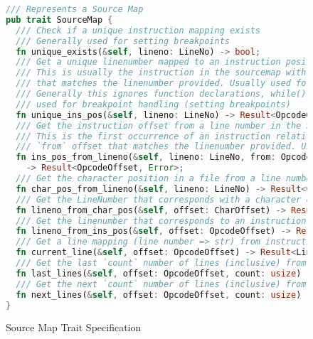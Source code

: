 \documentclass{report}
\begin{document}
\begin{figure}[!h]
    \begin{lstlisting}[language=Rust,basicstyle=\footnotesize]
/// Represents a Source Map
pub trait SourceMap {
  /// Check if a unique instruction mapping exists
  /// Generally used for setting breakpoints
  fn unique_exists(&self, lineno: LineNo) -> bool;
  /// Get a unique linenumber mapped to an instruction position
  /// This is usually the instruction in the sourcemap with the shortest length,
  /// that matches the linenumber provided. Usually used for run_until().
  /// Generally this ignores function declarations, while() loops, and if() statements
  /// used for breakpoint handling (setting breakpoints)
  fn unique_ins_pos(&self, lineno: LineNo) -> Result<OpcodeOffset, Error>;
  /// Get the instruction offset from a line number in the Source Code.
  /// This is the first occurrence of an instruction relative to
  /// `from` offset that matches the linenumber provided. Usually used for step()
  fn ins_pos_from_lineno(&self, lineno: LineNo, from: OpcodeOffset)
	-> Result<OpcodeOffset, Error>;
  /// Get the character position in a file from a line number (Ignores leading whitespace)
  fn char_pos_from_lineno(&self, lineno: LineNo) -> Result<CharOffset, Error>;
  /// Get the LineNumber that corresponds with a character offset
  fn lineno_from_char_pos(&self, offset: CharOffset) -> Result<LineNo, Error>;
  /// Get the linenumber that corresponds to an instruction position
  fn lineno_from_ins_pos(&self, offset: OpcodeOffset) -> Result<LineNo, Error>;
  /// Get a line mapping (line number => str) from instruction position/offset
  fn current_line(&self, offset: OpcodeOffset) -> Result<Line, Error>;
  /// Get the last `count` number of lines (inclusive) from instruction position/offset
  fn last_lines(&self, offset: OpcodeOffset, count: usize) -> Result<Vec<Line>, Error>;
  /// Get the next `count` number of lines (inclusive) from instruction position/offset
  fn next_lines(&self, offset: OpcodeOffset, count: usize) -> Result<Vec<Line>, Error>;
}
    \end{lstlisting}
    \caption{Source Map Trait Specification}
\end{figure}

	\newpage
\end{document}
